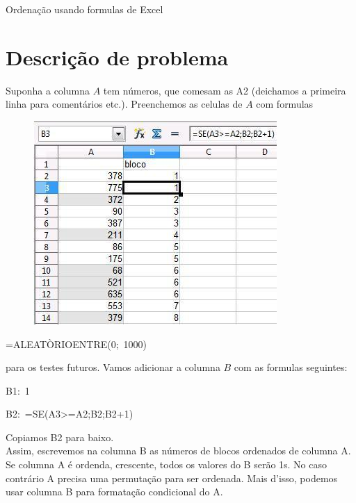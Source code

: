\documentclass[12pt]{article}
\begin{document}
\begin{center}
Ordena\c{c}\~ao usando formulas de Excel
\end{center}

\begin{abstract}
Columna A de plalinha conten os valores num\'ericos, que devem ser
ordenados em outra columna, usando somente as fun\c{c}\~oes e
Excel. N\'os propormos essa ordena\c{c}c\~ao usando somente as
func\c{c}\~oes: SE, INDIRETO, CONCATENAR, LINHA, \`EERROS,
CORRESP.
\end{abstract}


\section{Descri\c{c}\~ao de problema}

Suponha a columna $A$ tem n\'umeros, que comesam as A2 (deichamos
a primeira linha para coment\'arios etc.). Preenchemos as celulas
de $A$ com formulas

\begin{figure}[htb]
\begin{center}
\includegraphics{./imgs/pic1}
\end{center}
\caption{}
\end{figure}

\centerline{=ALEAT\`ORIOENTRE(0;\, 1000)}

\noindent para os testes futuros. Vamos adicionar a columna $B$
com as formulas seguintes:

B1:\, 1

B2:\, =SE(A3\textgreater =A2;B2;B2+1)

Copiamos B2 para baixo.\\

Assim, escrevemos na columna B as n\'umeros de blocos ordenados de
columna A. Se columna A \'e ordenda, crescente, todos os valores
do B ser\~ao 1s. No caso contr\'ario A precisa uma
permuta\c{c}\~ao para ser ordenada. Mais d'isso, podemos usar
columna B para formata\c{c}\~ao condicional do A.
\end{document}
